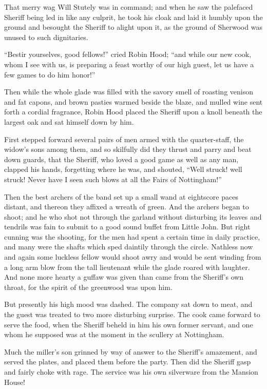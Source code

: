 That merry wag Will Stutely was in command; and when he saw the
palefaced Sheriff being led in like any culprit, he took his cloak and
laid it humbly upon the ground and besought the Sheriff to alight upon
it, as the ground of Sherwood was unused to such dignitaries.

``Bestir yourselves, good fellows!'' cried Robin Hood; ``and while our
new cook, whom I see with us, is preparing a feast worthy of our high
guest, let us have a few games to do him honor!''

Then while the whole glade was filled with the savory smell of roasting
venison and fat capons, and brown pasties warmed beside the blaze, and
mulled wine sent forth a cordial fragrance, Robin Hood placed the
Sheriff upon a knoll beneath the largest oak and sat himself down by
him.

First stepped forward several pairs of men armed with the quarter-staff,
the widow's sons among them, and so skilfully did they thrust and parry
and beat down guards, that the Sheriff, who loved a good game as well as
any man, clapped his hands, forgetting where he was, and shouted, ``Well
struck! well struck! Never have I seen such blows at all the Fairs of
Nottingham!''

Then the best archers of the band set up a small wand at eightscore
paces distant, and thereon they affixed a wreath of green. And the
archers began to shoot; and he who shot not through the garland without
disturbing its leaves and tendrils was fain to submit to a good sound
buffet from Little John. But right cunning was the shooting, for the men
had spent a certain time in daily practice, and many were the shafts
which sped daintily through the circle. Nathless now and again some
luckless fellow would shoot awry and would be sent winding from a long
arm blow from the tall lieutenant while the glade roared with laughter.
And none more hearty a guffaw was given than came from the Sheriff's own
throat, for the spirit of the greenwood was upon him.

But presently his high mood was dashed. The company sat down to meat,
and the guest was treated to two more disturbing surprise. The cook came
forward to serve the food, when the Sheriff beheld in him his own former
servant, and one whom he supposed was at the moment in the scullery at
Nottingham.

Much the miller's son grinned by way of answer to the Sheriff's
amazement, and served the plates, and placed them before the party. Then
did the Sheriff gasp and fairly choke with rage. The service was his own
silverware from the Mansion House!

